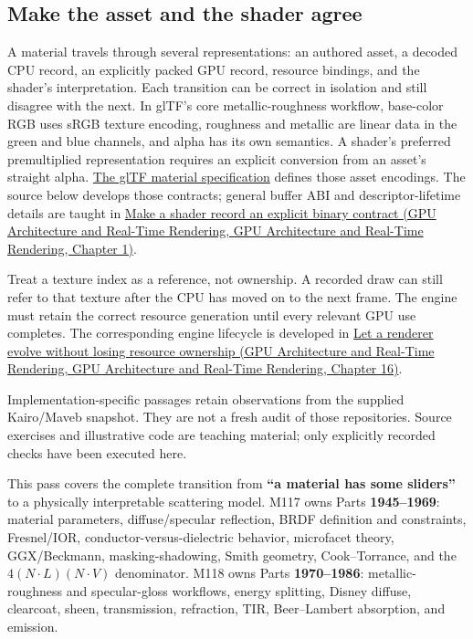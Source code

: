 \subsection{Make the asset and the shader agree}\label{03-visual-computing-i-ch005-make-the-asset-and-the-shader-agree}

A material travels through several representations: an authored asset, a decoded CPU record, an explicitly packed GPU record, resource bindings, and the shader's interpretation. Each transition can be correct in isolation and still disagree with the next. In glTF's core metallic-roughness workflow, base-color RGB uses sRGB texture encoding, roughness and metallic are linear data in the green and blue channels, and alpha has its own semantics. A shader's preferred premultiplied representation requires an explicit conversion from an asset's straight alpha. \href{https://raw.githubusercontent.com/KhronosGroup/glTF/main/specification/2.0/Specification.adoc}{The glTF material specification} defines those asset encodings. The source below develops those contracts; general buffer ABI and descriptor-lifetime details are taught in \href{../06-GPU-Architecture-and-Real-Time-Rendering/main.pdf\#nameddest=01-foundations-i-ch008-make-a-shader-record-an-explicit-binary-contract}{Make a shader record an explicit binary contract (GPU Architecture and Real-Time Rendering, GPU Architecture and Real-Time Rendering, Chapter 1)}.

Treat a texture index as a reference, not ownership. A recorded draw can still refer to that texture after the CPU has moved on to the next frame. The engine must retain the correct resource generation until every relevant GPU use completes. The corresponding engine lifecycle is developed in \href{../06-GPU-Architecture-and-Real-Time-Rendering/main.pdf\#nameddest=06-engine-ii-ch025-let-a-renderer-evolve-without-losing-resource-ownership}{Let a renderer evolve without losing resource ownership (GPU Architecture and Real-Time Rendering, GPU Architecture and Real-Time Rendering, Chapter 16)}.

Implementation-specific passages retain observations from the supplied Kairo/Maveb snapshot. They are not a fresh audit of those repositories. Source exercises and illustrative code are teaching material; only explicitly recorded checks have been executed here.

This pass covers the complete transition from \textbf{``a material has some sliders''} to a physically interpretable scattering model. M117 owns Parts \textbf{1945--1969}: material parameters, diffuse/specular reflection, BRDF definition and constraints, Fresnel/IOR, conductor-versus-dielectric behavior, microfacet theory, GGX/Beckmann, masking-shadowing, Smith geometry, Cook--Torrance, and the \(4(N\!\cdot L)(N\!\cdot V)\) denominator. M118 owns Parts \textbf{1970--1986}: metallic-roughness and specular-gloss workflows, energy splitting, Disney diffuse, clearcoat, sheen, transmission, refraction, TIR, Beer--Lambert absorption, and emission.

